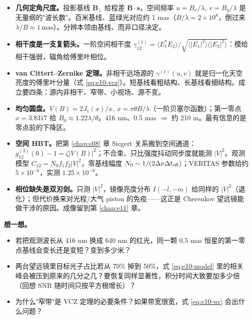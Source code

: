 \begin{itemize}
  \item \textbf{几何定角尺度。}投影基线 \(\bm B_\perp\) 给程差 \(\bm B\cdot\bm s\)，空间频率 \(u=B_x/\lambda,\ v=B_y/\lambda\) 是无量纲的"波长数"。百米基线、蓝绿光对应约 1 mas（\(B/\lambda=2\times10^8\)，倒过来 \(\lambda/B\approx1\,\mathrm{mas}\)）。分辨本领由基线、而非口径决定。
  \item \textbf{相干度是一支复箭头。}一阶空间相干度 \(\gamma_{12}^{(1)}=\langle E_1^\ast E_2\rangle/\sqrt{\langle|E_1|^2\rangle\langle|E_2|^2\rangle}\)：模给相干强弱，辐角给傅里叶相位。
  \item \textbf{van Cittert--Zernike 定理。}非相干远场源的 \(\gamma^{(1)}(u,v)\) 就是归一化天空亮度的傅里叶分量（式 \eqref{eq:e10-vcz}）。短基线看粗结构、长基线看细结构。成立要四条：源内非相干、窄带、小视场、源不变。
  \item \textbf{均匀圆盘。}\(V(B)=2J_1(x)/x,\ x=\pi\theta B/\lambda\)（一阶贝塞尔函数）；第一零点 \(x=3.8317\) 给 \(B_0\approx1.22\lambda/\theta\)。416 nm、0.5 mas \(\Rightarrow\) 约 210 m。最有信息的是零点前的下降区。
  \item \textbf{空间 HBT。}把第 \ref{chap:e08} 章 Siegert 关系搬到空间通道：\(g_{12}^{(2)}(0)-1=\zeta|V(B)|^2\)；不合束、只比强度抖动同步度就能测 \(|V|^2\)。观测模型 \(C_{12}=N_0 f_1 f_2|V|^2\)，零基线幅度 \(N_0\sim1/(2\Delta\nu\Delta t_{\rm eff})\)；VERITAS 参数给约 \(5\times10^{-6}\)，实测 \(1.25\times10^{-6}\)。
  \item \textbf{相位缺失是双刃剑。}只测 \(|V|^2\)，镜像亮度分布 \(I(-l,-m)\) 给同样的 \(|V|^2\)（退化）；但代价换来对光程/大气 piston 的免疫——这正是 Cherenkov 望远镜能做干涉的原因。成像留到第 \ref{chap:e11} 章。
\end{itemize}

\medskip
\noindent\textbf{想一想。}
\begin{itemize}
  \item 若把观测波长从 416 nm 换成 640 nm 的红光，同一颗 0.5 mas 恒星的第一零点基线会变长还是变短？变到多少米？
  \item 两台望远镜里目标光子占比若从 70\% 掉到 50\%，式 \eqref{eq:e10-model} 里的相关峰会被压到原来的几分之几？要恢复同样显著性，积分时间大致要加多少倍（回想 SNR 随时间只按平方根增长）？
  \item 为什么"窄带"是 VCZ 定理的必要条件？如果带宽很宽，式 \eqref{eq:e10-uv} 会出什么问题？
\end{itemize}

